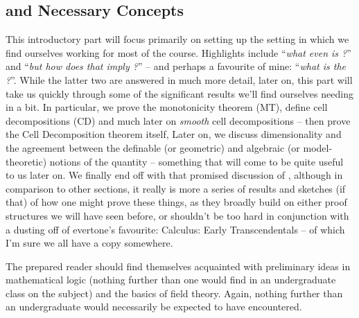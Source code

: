 % 
%
%

\begin{partbacktext}
\part{\Omy and Necessary Concepts}
\noindent This introductory part will focus primarily on setting up the setting in which we find ourselves working for most of the course. Highlights include ``\emph{what even is \omy?}'' and ``\emph{but how does that imply \pw?}'' -- and perhaps a favourite of mine: ``\emph{what is the \pwt?}''. While the latter two are answered in much more detail, later on, this part will take us quickly through some of the significant results we'll find ourselves needing in a bit. In particular, we prove the monotonicity theorem (MT), define cell decompositions (CD) and much later on \emph{smooth} cell decompositions -- then prove the Cell Decomposition theorem itself, Later on, we discuss dimensionality and the agreement between the definable (or geometric) and algebraic (or model-theoretic) notions of the quantity -- something that will come to be quite useful to us later on. We finally end off with that promised discussion of \scds, although in comparison to other sections, it really is more a series of results and sketches (if that) of how one might prove these things, as they broadly build on either proof structures we will have seen before, or shouldn't be too hard in conjunction with a dusting off of evertone's favourite: Calculus: Early Transcendentals -- of which I'm sure we all have a copy somewhere.

The prepared reader should find themselves acquainted with preliminary ideas in mathematical logic (nothing further than one would find in an undergraduate class on the subject) and the basics of field theory. Again, nothing further than an undergraduate would necessarily be expected to have encountered.


\end{partbacktext}
